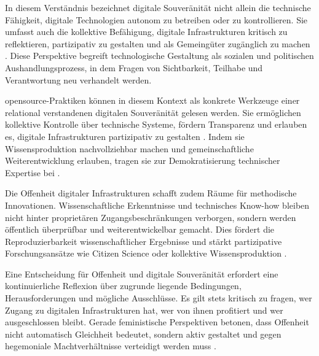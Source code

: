 In diesem Verständnis bezeichnet digitale Souveränität nicht allein die technische Fähigkeit, digitale Technologien autonom zu betreiben oder zu kontrollieren. Sie umfasst auch die kollektive Befähigung, digitale Infrastrukturen kritisch zu reflektieren, partizipativ zu gestalten und als Gemeingüter zugänglich zu machen \parencite{baackDataficationEmpowermentHow2015,glaszeContestedSpatialitiesDigital2023}. Diese Perspektive begreift technologische Gestaltung als sozialen und politischen Aushandlungsprozess, in dem Fragen von Sichtbarkeit, Teilhabe und Verantwortung neu verhandelt werden.

\gls{opensource}-Praktiken können in diesem Kontext als konkrete Werkzeuge einer relational verstandenen digitalen Souveränität gelesen werden. Sie ermöglichen kollektive Kontrolle über technische Systeme, fördern Transparenz und erlauben es, digitale Infrastrukturen partizipativ zu gestalten \parencite{gurumurthyDataBodiesNew2022}. Indem sie Wissensproduktion nachvollziehbar machen und gemeinschaftliche Weiterentwicklung erlauben, tragen sie zur Demokratisierung technischer Expertise bei \parencite{baackDataficationEmpowermentHow2015, pohleDigitalSovereignty2020}.

Die Offenheit digitaler Infrastrukturen schafft zudem Räume für methodische Innovationen. Wissenschaftliche Erkenntnisse und technisches Know-how bleiben nicht hinter proprietären Zugangsbeschränkungen verborgen, sondern werden öffentlich überprüfbar und weiterentwickelbar gemacht. Dies fördert die Reproduzierbarkeit wissenschaftlicher Ergebnisse und stärkt partizipative Forschungsansätze wie Citizen Science oder kollektive Wissensproduktion \parencite{fecherWhatDrivesAcademic2014}.

Eine Entscheidung für Offenheit und digitale Souveränität erfordert eine kontinuierliche Reflexion über zugrunde liegende Bedingungen, Herausforderungen und mögliche Ausschlüsse. Es gilt stets kritisch zu fragen, wer Zugang zu digitalen Infrastrukturen hat, wer von ihnen profitiert und wer ausgeschlossen bleibt. Gerade feministische Perspektiven betonen, dass Offenheit nicht automatisch Gleichheit bedeutet, sondern aktiv gestaltet und gegen hegemoniale Machtverhältnisse verteidigt werden muss \parencite{wilshireTimeRebootFeminism2024}.
